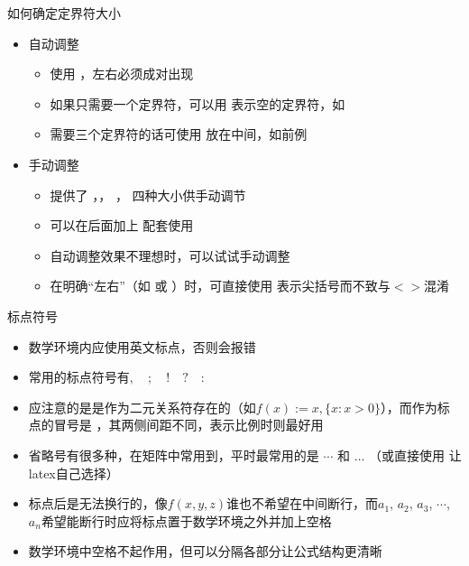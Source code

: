 \begin{frame}[fragile]{如何确定定界符大小}
	\begin{itemize}
		\item 自动调整
		\begin{itemize}
			\item 使用 \cprotect{}，左右必须成对出现
			\item 如果只需要一个定界符，可以用 \cprotect{} 表示空的定界符，如 \cprotect{}
			\item 需要三个定界符的话可使用 \cprotect\fbox{\verb|\middle|} 放在中间，如前例
		\end{itemize}
		\item 手动调整
		\begin{itemize}
			\item 提供了 \cprotect\fbox{\verb|\big|}，\cprotect\fbox{\verb|\Big|}， \cprotect\fbox{\verb|\bigg|}，\cprotect\fbox{\verb|\Bigg|} 四种大小供手动调节
			\item 可以在后面加上 \cprotect{} 配套使用
			\item 自动调整效果不理想时，可以试试手动调整
			\item 在明确“左右”（如 \cprotect\fbox{\verb|\left \right|} 或 \cprotect\fbox{\verb|\Bigl \Bigr|}）时，可直接使用 \cprotect\fbox{\verb|<>|} 表示尖括号而不致与$<>$混淆
		\end{itemize}
	\end{itemize}
\end{frame}
\begin{frame}[fragile]{标点符号}
	\begin{itemize}
		\item 数学环境内应使用英文标点，否则会报错
		\item 常用的标点符号有$, \quad ; \quad ! \quad ? \quad \colon$
		\item 应注意的是\cprotect\fbox{\verb|:|}是作为二元关系符存在的（如$f(x):=x, \{x : x>0\}$），而作为标点的冒号是 \cprotect\fbox{\verb|\colon|}，其两侧间距不同，表示比例时则最好用 \cprotect\fbox{\verb|\mathbin{:}|}
		\item 省略号有很多种，在矩阵中常用到，平时最常用的是 \cprotect\fbox{\verb|\cdots|} $\cdots$ 和 \cprotect\fbox{\verb|\ldots|} $\ldots$ （或直接使用 \cprotect\fbox{\verb|\dots|} 让latex自己选择）
		\item 标点后是无法换行的，像$f(x,y,z)$谁也不希望在中间断行，而$a_1$\textrm{,} $a_2$\textrm{,} $a_3$\textrm{,} $\cdots$\textrm{,} $a_n$希望能断行时应将标点置于数学环境之外并加上空格
		\item 数学环境中空格不起作用，但可以分隔各部分让公式结构更清晰
	\end{itemize}
\end{frame}


